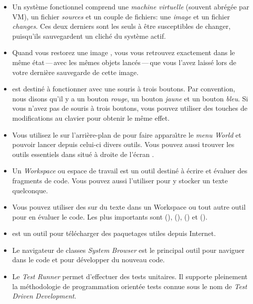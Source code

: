 \documentclass[a4paper,10pt,twoside]{book}
\begin{document}
\begin{itemize}
  \item Un syst\`eme \sq fonctionnel comprend une \emph{machine
      virtuelle} (souvent abr\'eg\'ee par VM), un fichier
    \emph{sources} et un couple de fichiers: une \emph{image} et un
    fichier \emph{changes}. Ces deux derniers sont les seuls \`a
    \^etre susceptibles de changer, puisqu'ils sauvegardent un clich\'e
    du syst\`eme actif.
  \item Quand vous restorez une image \sq, vous vous retrouvez
    exactement dans le m\^eme \'etat\,---\,avec les m\^emes objets
    lanc\'es\,---\,que vous l'avez laiss\'e lors de votre derni\`ere
    sauvegarde de cette image.
  \item \sq est destin\'e \`a fonctionner avec une souris \`a trois
    boutons. Par convention, nous disons qu'il y a un bouton \emph{rouge}, un bouton
    \emph{jaune} et un bouton \emph{bleu}. Si vous n'avez pas de
    souris \`a trois boutons, vous pouvez utiliser des touches de
    modifications au clavier pour obtenir le m\^eme effet.
  \item Vous utilisez le  sur l'arri\`ere-plan de
    \sq pour faire appara\^{\i}tre le \emph{menu World} et pouvoir
    lancer depuis celui-ci divers outils. Vous pouvez aussi trouver
    les outils essentiels dans \toolsflapind situ\'e \`a droite de
    l'\'ecran \sq.
  \item Un \emph{Workspace} ou espace de travail est un outil
    destin\'e \`a \'ecrire et \'evaluer des fragments de code. Vous
    pouvez aussi l'utiliser pour y stocker un texte quelconque.
  \item Vous pouvez utiliser des  sur du texte
    dans un Workspace ou tout autre outil pour en
    \'evaluer le code. Les plus importants sont  (),  (),  () et  ().
  \item \sqmap est un outil pour t\'el\'echarger des paquetages utiles
    depuis Internet.
  \item Le navigateur de classes \emph{System Browser} est le
    principal outil pour naviguer dans le code \sq et pour
    d\'evelopper du nouveau code.
  \item Le \emph{Test Runner} permet d'effectuer des tests
    unitaires. Il supporte pleinement la m\'ethodologie de
    programmation orient\'ee tests connue sous le nom de \emph{Test
      Driven Development}.
\end{itemize}

\ifx\wholebook\relax\else 
   
   
\end{document}
